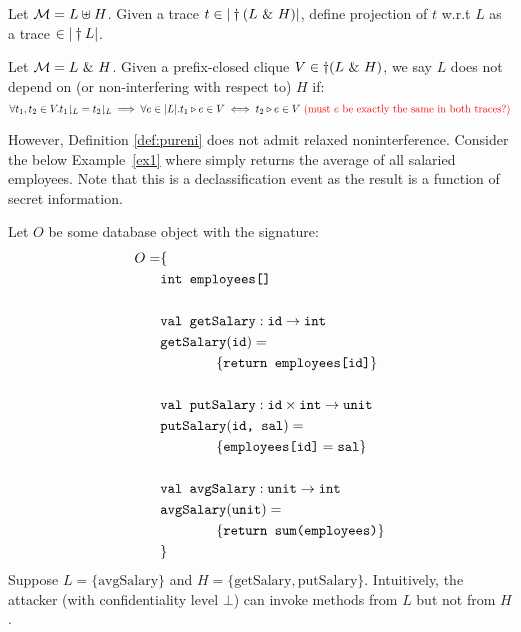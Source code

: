 \documentclass[acmsmall,screen,review, nonacm]{acmart}
\begin{document}
\begin{definition}
  Let $\mathcal{M} = L \uplus H$. Given a trace $t \in |\dagger (L ~\&~ H)|$, define projection of $t$ w.r.t $L$ as a trace   $\in |\dagger L|$.
\end{definition}


\begin{definition}\label{def:pureni}
  Let $\mathcal{M} = L ~\&~ H$. Given a prefix-closed clique $V \in \dagger(L ~\&~ H)$, we say $L$ does not depend on (or non-interfering with respect to) $H$ if:
  \[
  \forall t_1, t_2 \in V. t_1{\downharpoonright_{ L}} =  t_2{\downharpoonright_{L}} \implies \forall e \in |L|. t_1  \triangleright e \in V \iff t_2 \triangleright e \in V \text{ \textcolor{red}{(must $e$ be exactly the same in both traces?)}}
  \]
\end{definition}

However, Definition \ref{def:pureni} does not  admit  relaxed noninterference.
Consider the below Example~\ref{ex1} where   simply returns the average of all salaried employees. Note that this is a declassification event as the result is a function of secret information.


\begin{example} \label{ex1}
  Let $O$ be some database object with the signature:
  \begin{align*}
    O = & \{ \\
    & \texttt{int} \texttt{ employees[]} \\
    \\
    & \texttt{val } \texttt{getSalary}: \texttt{id} \to \texttt{int} \\
    & \texttt{getSalary} (\texttt{id}) =  \\
    & \qquad \qquad \{ \texttt{return employees[id]} \} \\
    \\
    & \texttt{val } \texttt{putSalary}: \texttt{id} \times \texttt{int} \to \texttt{unit} \\
    & \texttt{putSalary} ( \texttt{id, sal}) =  \\
    & \qquad \qquad   \{ \texttt{employees[id]} = \texttt{sal}  \} \\
    \\
    & \texttt{val } \texttt{avgSalary}: \texttt{unit} \to \texttt{int} \\
    & \texttt{avgSalary} (\texttt{unit}) =  \\
    & \qquad \qquad \{ \texttt{return sum(employees)} \} \\
    & \}
  \end{align*}
  Suppose $L = \{ \text{avgSalary} \}$ and $H = \{\text{getSalary}, \text{putSalary} \}$. Intuitively, the  attacker (with confidentiality level $\bot$) can  invoke  methods from $L$ but not from $H$.
  \end{example}
\end{document}
